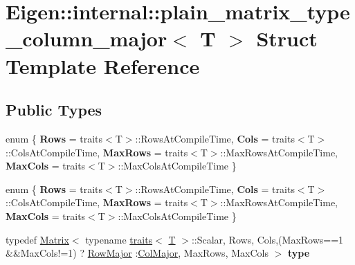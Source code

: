 \hypertarget{struct_eigen_1_1internal_1_1plain__matrix__type__column__major}{}\section{Eigen\+:\+:internal\+:\+:plain\+\_\+matrix\+\_\+type\+\_\+column\+\_\+major$<$ T $>$ Struct Template Reference}
\label{struct_eigen_1_1internal_1_1plain__matrix__type__column__major}
\subsection*{Public Types}
\begin{DoxyCompactItemize}
\item 
\mbox{\label{struct_eigen_1_1internal_1_1plain__matrix__type__column__major_a27bd0c7c6216e416e16c532ed3f73d09}} 
enum \{ {\bfseries Rows} = traits$<$T$>$\+:\+:Rows\+At\+Compile\+Time, 
{\bfseries Cols} = traits$<$T$>$\+:\+:Cols\+At\+Compile\+Time, 
{\bfseries Max\+Rows} = traits$<$T$>$\+:\+:Max\+Rows\+At\+Compile\+Time, 
{\bfseries Max\+Cols} = traits$<$T$>$\+:\+:Max\+Cols\+At\+Compile\+Time
 \}
\item 
\mbox{\label{struct_eigen_1_1internal_1_1plain__matrix__type__column__major_a4fb35dcad09f50b45fb46f16d1e20ed2}} 
enum \{ {\bfseries Rows} = traits$<$T$>$\+:\+:Rows\+At\+Compile\+Time, 
{\bfseries Cols} = traits$<$T$>$\+:\+:Cols\+At\+Compile\+Time, 
{\bfseries Max\+Rows} = traits$<$T$>$\+:\+:Max\+Rows\+At\+Compile\+Time, 
{\bfseries Max\+Cols} = traits$<$T$>$\+:\+:Max\+Cols\+At\+Compile\+Time
 \}
\item 
\mbox{\label{struct_eigen_1_1internal_1_1plain__matrix__type__column__major_a654e6577d45ae0cfb657d21311124850}} 
typedef \hyperlink{group___core___module_class_eigen_1_1_matrix}{Matrix}$<$ typename \hyperlink{struct_eigen_1_1internal_1_1traits}{traits}$<$ \hyperlink{group___sparse_core___module}{T} $>$\+::Scalar, Rows, Cols,(Max\+Rows==1 \&\&Max\+Cols!=1) ? \hyperlink{group__enums_ggaacded1a18ae58b0f554751f6cdf9eb13acfcde9cd8677c5f7caf6bd603666aae3}{Row\+Major} \+:\hyperlink{group__enums_ggaacded1a18ae58b0f554751f6cdf9eb13a0cbd4bdd0abcfc0224c5fcb5e4f6669a}{Col\+Major}, Max\+Rows, Max\+Cols $>$ {\bfseries type}

\end{DoxyCompactItemize}
